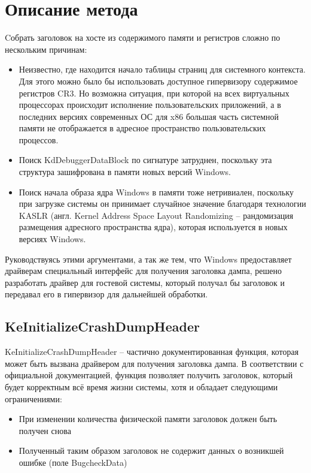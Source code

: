 \documentclass{mipt-thesis-bs}
\begin{document}
\chapter{Описание метода}

Cобрать заголовок на хосте из содержимого памяти и регистров сложно по нескольким причинам:

\begin{itemize}
\item Неизвестно, где находится начало таблицы страниц для системного контекста. Для этого можно было бы использовать доступное гипервизору содержимое регистров CR3. Но возможна ситуация, при которой на всех виртуальных процессорах происходит исполнение пользовательских приложений, а в последних версиях современных ОС для x86 большая часть системной памяти не отображается в адресное пространство пользовательских процессов.
\item Поиск KdDebuggerDataBlock по сигнатуре затруднен, поскольку эта структура зашифрована в памяти новых версий Windows.
\item Поиск начала образа ядра Windows в памяти тоже нетривиален, поскольку при загрузке системы он принимает случайное значение благодаря технологии KASLR (англ. Kernel Address Space Layout Randomizing -- рандомизация размещения адресного пространства ядра), которая используется в новых версиях Windows.
\end{itemize}

Руководствуясь этими аргументами, а так же тем, что Windows предоставляет драйверам специальный интерфейс для получения заголовка дампа, решено разработать драйвер для гостевой системы, который получал бы заголовок и передавал его в гипервизор для дальнейшей обработки.

\section*{KeInitializeCrashDumpHeader}

KeInitializeCrashDumpHeader -- частично документированная функция, которая может быть вызвана драйвером для получения заголовка дампа.
В соответствии с официальной документацией, функция позволяет получить заголовок, который будет корректным всё время жизни системы, хотя и обладает следующими ограничениями:

\begin{itemize}
\item При изменении количества физической памяти заголовок должен быть получен снова
\item Полученный таким образом заголовок не содержит данных о возникшей ошибке (поле BugcheckData)
\end{itemize}
\end{document}
